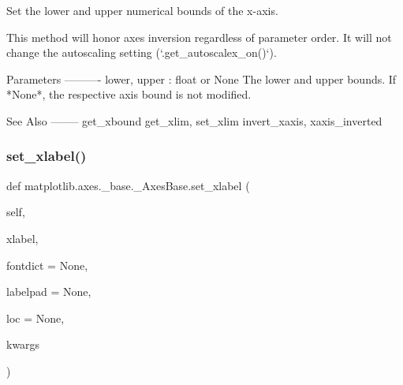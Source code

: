 \begin{DoxyVerb}Set the lower and upper numerical bounds of the x-axis.

This method will honor axes inversion regardless of parameter order.
It will not change the autoscaling setting (`.get_autoscalex_on()`).

Parameters
----------
lower, upper : float or None
    The lower and upper bounds. If *None*, the respective axis bound
    is not modified.

See Also
--------
get_xbound
get_xlim, set_xlim
invert_xaxis, xaxis_inverted
\end{DoxyVerb}
 \mbox{\label{classmatplotlib_1_1axes_1_1__base_1_1__AxesBase_ad8536294adfb9b0319ea6245cae56777}} 
\subsubsection{\texorpdfstring{set\+\_\+xlabel()}{set\_xlabel()}}
{\footnotesize\ttfamily def matplotlib.\+axes.\+\_\+base.\+\_\+\+Axes\+Base.\+set\+\_\+xlabel (\begin{DoxyParamCaption}\item[{}]{self,  }\item[{}]{xlabel,  }\item[{}]{fontdict = {\ttfamily None},  }\item[{}]{labelpad = {\ttfamily None},  }\item[{}]{loc = {\ttfamily None},  }\item[{}]{kwargs }\end{DoxyParamCaption})}

